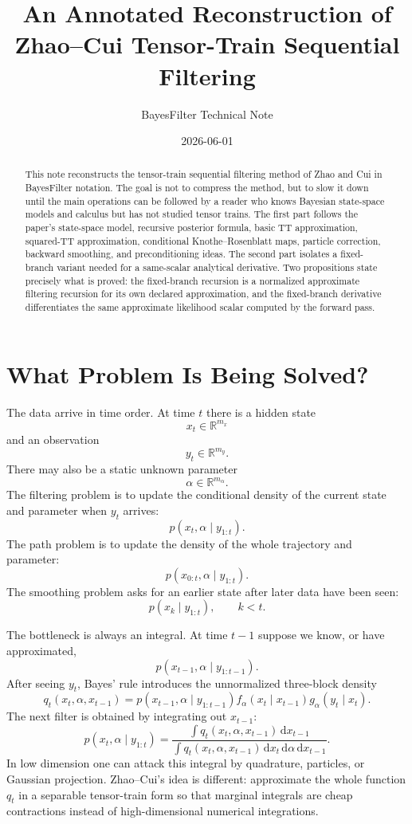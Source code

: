 \documentclass[11pt]{article}
\title{An Annotated Reconstruction of Zhao--Cui Tensor-Train Sequential Filtering}
\author{BayesFilter Technical Note}
\date{2026-06-01}
\newcommand{\R}{\mathbb R}
\newcommand{\dd}{\,\mathrm d}
\begin{document}
\maketitle

\begin{abstract}
This note reconstructs the tensor-train sequential filtering method of Zhao and
Cui in BayesFilter notation.  The goal is not to compress the method, but to
slow it down until the main operations can be followed by a reader who knows
Bayesian state-space models and calculus but has not studied tensor trains.  The
first part follows the paper's state-space model, recursive posterior formula,
basic TT approximation, squared-TT approximation, conditional
Knothe--Rosenblatt maps, particle correction, backward smoothing, and
preconditioning ideas.  The second part isolates a fixed-branch variant needed
for a same-scalar analytical derivative.  Two propositions state precisely what
is proved: the fixed-branch recursion is a normalized approximate filtering
recursion for its own declared approximation, and the fixed-branch derivative
differentiates the same approximate likelihood scalar computed by the forward
pass.
\end{abstract}

\tableofcontents

\section{What Problem Is Being Solved?}

The data arrive in time order.  At time \(t\) there is a hidden state
\[
    x_t\in \R^{m_x}
\]
and an observation
\[
    y_t\in \R^{m_y}.
\]
There may also be a static unknown parameter
\[
    \alpha\in \R^{m_\alpha}.
\]
The filtering problem is to update the conditional density of the current state
and parameter when \(y_t\) arrives:
\[
    p(x_t,\alpha\mid y_{1:t}).
\]
The path problem is to update the density of the whole trajectory and parameter:
\[
    p(x_{0:t},\alpha\mid y_{1:t}).
\]
The smoothing problem asks for an earlier state after later data have been seen:
\[
    p(x_k\mid y_{1:t}),\qquad k<t.
\]

The bottleneck is always an integral.  At time \(t-1\) suppose we know, or have
approximated,
\[
    p(x_{t-1},\alpha\mid y_{1:t-1}).
\]
After seeing \(y_t\), Bayes' rule introduces the unnormalized three-block
density
\[
    q_t(x_t,\alpha,x_{t-1})
    =
    p(x_{t-1},\alpha\mid y_{1:t-1})
    f_\alpha(x_t\mid x_{t-1})
    g_\alpha(y_t\mid x_t).
\]
The next filter is obtained by integrating out \(x_{t-1}\):
\[
    p(x_t,\alpha\mid y_{1:t})
    =
    \frac{\int q_t(x_t,\alpha,x_{t-1})\dd x_{t-1}}
    {\int q_t(x_t,\alpha,x_{t-1})\dd x_t\dd\alpha\dd x_{t-1}}.
\]
In low dimension one can attack this integral by quadrature, particles, or
Gaussian projection.  Zhao--Cui's idea is different: approximate the whole
function \(q_t\) in a separable tensor-train form so that marginal integrals are
cheap contractions instead of high-dimensional numerical integrations.
\end{document}
